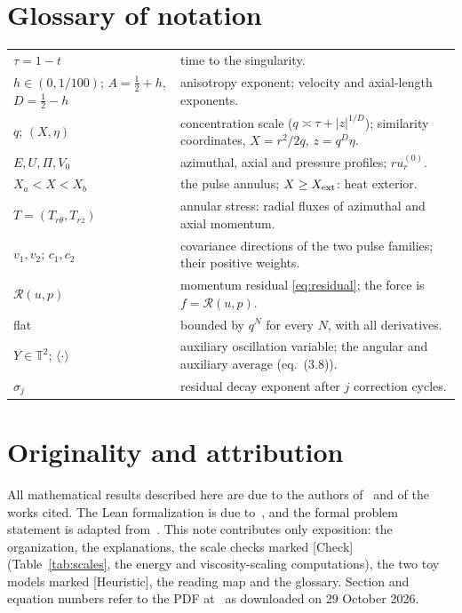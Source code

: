 \documentclass[11pt]{article}
\newcommand{\T}{\mathbb{T}}
\newcommand{\Res}{\mathcal{R}}
\newcommand{\avg}[1]{\langle #1\rangle}
\theoremstyle{plain}
\theoremstyle{remark}
\newcommand{\chk}{\textsf{\small[Check]}}
\newcommand{\heur}{\textsf{\small[Heuristic]}}
\begin{document}
\section{Glossary of notation}
\begin{center}\small
\begin{tabularx}{\linewidth}{@{}l X@{}}
\toprule
$\tau=1-t$ & time to the singularity.\\
$h\in(0,1/100)$; $A=\tfrac12+h$, $D=\tfrac12-h$ & anisotropy exponent; velocity and axial-length exponents.\\
$q$; $(X,\eta)$ & concentration scale ($q\asymp\tau+|z|^{1/D}$); similarity coordinates, $X=r^2/2q$, $z=q^D\eta$.\\
$E,U,\Pi,V_0$ & azimuthal, axial and pressure profiles; $ru_r^{(0)}$.\\
$X_a<X<X_b$ & the pulse annulus; $X\ge X_{\rm ext}$: heat exterior.\\
$T=(T_{r\theta},T_{rz})$ & annular stress: radial fluxes of azimuthal and axial momentum.\\
$v_1,v_2$; $c_1,c_2$ & covariance directions of the two pulse families; their positive weights.\\
$\Res(u,p)$ & momentum residual \eqref{eq:residual}; the force is $f=\Res(u,p)$.\\
flat & bounded by $q^N$ for every $N$, with all derivatives.\\
$Y\in\T^2$; $\avg{\cdot}$ & auxiliary oscillation variable; the angular and auxiliary average (eq.~(3.8)).\\
$\sigma_j$ & residual decay exponent after $j$ correction cycles.\\
\bottomrule
\end{tabularx}
\end{center}

\section*{Originality and attribution}
All mathematical results described here are due to the authors of~\cite{OAI} and of the works cited. The Lean formalization is due to~\cite{OAILean}, and the formal problem statement is adapted from~\cite{FC}. This note contributes only exposition: the organization, the explanations, the scale checks marked \chk{} (Table~\ref{tab:scales}, the energy and viscosity-scaling computations), the two toy models marked \heur{}, the reading map and the glossary. Section and equation numbers refer to the PDF at~\cite{OAI} as downloaded on 29 October 2026.
\end{document}
